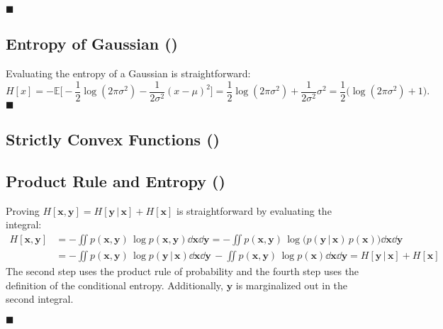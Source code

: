 \documentclass[11pt, a4paper]{scrartcl}
\newcommand{\E}{\mathbb{E}}
\renewcommand{\vec}[1]{\bm{#1}}
\newcommand{\given}{\,\vert\,}
\newcommand{\eot}{\hfill\(\blacksquare\)}
\newcommand{\diffstar}{\texorpdfstring{\raisebox{-1pt}{\resizebox{!}{8pt}{\(\star\)}}}{*}}
\newcommand{\onestar}  {(\diffstar)}
\begin{document}
			\eot

		\subsection{Entropy of Gaussian  \onestar}
			Evaluating the entropy of a Gaussian is straightforward:
			\begin{equation}
				H[x]
					= -\E\bigg[\! -\frac{1}{2} \log(2\pi\sigma^2) - \frac{1}{2 \sigma^2} (x - \mu)^2 \bigg]
					= \frac{1}{2} \log(2\pi\sigma^2) + \frac{1}{2 \sigma^2} \sigma^2
					= \frac{1}{2} \Big(\! \log(2\pi\sigma^2) + 1 \Big).
			\end{equation}
			\eot

		\subsection{Strictly Convex Functions  \onestar}

		\subsection{Product Rule and Entropy  \onestar}
			Proving \( H[\vec{x}, \vec{y}] = H[\vec{y} \given \vec{x}] + H[\vec{x}] \) is straightforward by evaluating the integral:
			\begin{align}
				H[\vec{x}, \vec{y}]
					&= -\iint\! p(\vec{x}, \vec{y}) \, \log p(\vec{x}, \vec{y}) \dd{\vec{x}} \dd{\vec{y}}
					 = -\iint\! p(\vec{x}, \vec{y}) \, \log\!\big( p(\vec{y} \given \vec{x}) \, p(\vec{x}) \big) \dd{\vec{x}} \dd{\vec{y}} \\
					&= -\iint\! p(\vec{x}, \vec{y}) \, \log p(\vec{y} \given \vec{x}) \dd{\vec{x}} \dd{\vec{y}} \,
					   -\iint\! p(\vec{x}, \vec{y}) \, \log p(\vec{x}) \dd{\vec{x}} \dd{\vec{y}}
					 = H[\vec{y} \given \vec{x}] + H[\vec{x}]
			\end{align}
			The second step uses the product rule of probability and the fourth step uses the definition of the conditional entropy. Additionally, \(\vec{y}\) is marginalized out in the second integral.

			\eot
\end{document}
